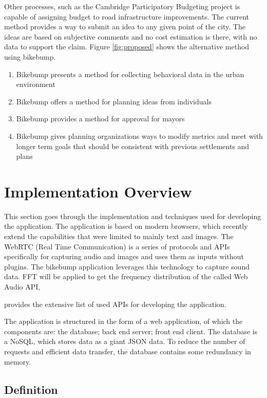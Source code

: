 Other processes, such as the Cambridge Participatory Budgeting project is capable of assigning budget to road infrastructure improvements. The current method provides a way to submit an idea to any given point of the city. The ideas are based on subjective comments and no cost estimation is there, with no data to support the claim. Figure \ref{fig:proposed} shows the alternative method using bikebump. 
\begin{enumerate}
  \item Bikebump presents a method for collecting behavioral data in the urban environment
  \item Bikebump offers a method for planning ideas from individuals
  \item Bikebump provides a method for approval for mayors
  \item Bikebump gives planning organizations ways to modify metrics and meet with longer term goals that should be consistent with previous settlements and plans
\end{enumerate}


\clearpage

\section{Implementation Overview}

This section goes through the implementation and techniques used for developing the application. The application is based on modern browsers, which recently extend the capabilities that were limited to mainly text and images. The WebRTC (Real Time Communication) is a series of protocols and APIs specifically for capturing audio and images and uses them as inputs without plugins. The bikebump application leverages this technology to capture sound data. FFT will be applied to get the frequency distribution of the called Web Audio API,

 provides the extensive list of used APIs for developing the application.

The application is structured in the form of a web application, of which the components are: the database; back end server; front end client. The database is a NoSQL, which stores data as a giant JSON data. To reduce the number of requests and efficient data transfer, the database contains some redundancy in memory.


\subsection{Definition}

